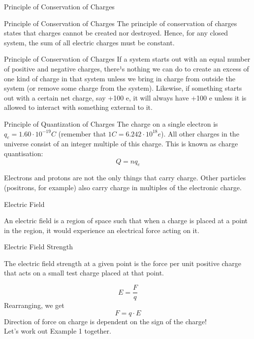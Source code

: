 \documentclass{beamer}
\begin{document}
\begin{frame}{Principle of Conservation of Charges}
\begin{block}{Principle of Conservation of Charges}
The principle of conservation of charges states that charges cannot be created nor destroyed.  Hence, for any closed system, the sum of all electric charges must be constant.
\end{block}
\end{frame}

\begin{frame}{Principle of Conservation of Charges}
If a system starts out with an equal number of positive and negative charges, there¹s nothing we can do to create an excess of one kind of charge in that system unless we bring in charge from outside the system (or remove some charge from the system). Likewise, if something starts out with a certain net charge, say +100 e, it will always have +100 e unless it is allowed to interact with something external to it. 
\end{frame}

\begin{frame}
\begin{block}{Principle of Quantization of Charges}
The charge on a single electron is \(q_e=1.60\cdot10^{-19}C\) (remember that \(1C=6.242\cdot 10^{18}e\)). All other charges in the universe consist of an integer multiple of this charge. This is known as charge quantisation:
\[Q=nq_e\]
\end{block}
Electrons and protons are not the only things that carry charge. Other particles (positrons, for example) also carry charge in multiples of the electronic charge.  
\end{frame}

\begin{frame}{Electric Field}{}
\begin{definition}
An electric field is a region of space such that when a charge is placed at a point in the region, it would experience an electrical force acting on it.
\end{definition}
\end{frame}

\begin{frame}{Electric Field Strength}
\begin{definition}
The electric field strength at a given point is the force per unit positive charge that acts on a small test charge placed at that point.
\end{definition}
\[E=\frac{F}{q}\]
Rearranging, we get
\[F=q\cdot E\]
Direction of force on charge is dependent on the sign of the charge!\\
Let's work out Example 1 together.
\end{frame}
\end{document}
